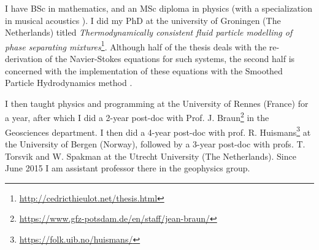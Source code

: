 
I have BSc in mathematics, and an MSc diploma in physics (with a specialization in 
musical acoustics \cite{dewl02}). I did my PhD at the 
university of Groningen (The Netherlands) titled {\sl Thermodynamically consistent 
fluid particle modelling of phase separating 
mixtures}\footnote{\url{http://cedricthieulot.net/thesis.html}}.
Although half of the thesis deals with the re-derivation of the Navier-Stokes 
equations for such systems\cite{esth03}, the second half is concerned with 
the implementation of these equations with the Smoothed Particle Hydrodynamics
method \cite{thje05a,thje05b,thes05}.

I then taught physics and programming at the University of Rennes (France) for a year, 
after which I did a 2-year post-doc with Prof. J. 
Braun\footnote{\url{https://www.gfz-potsdam.de/en/staff/jean-braun/}} in the 
Geosciences department. 
I then did a 4-year post-doc with prof. R. 
Huismans\footnote{\url{https://folk.uib.no/huismans/}} at the University of Bergen (Norway), 
followed by a 3-year post-doc with profs. T. Torsvik and W. Spakman at the Utrecht
University (The Netherlands). 
Since June 2015 I am assistant professor there in the geophysics group.
 
